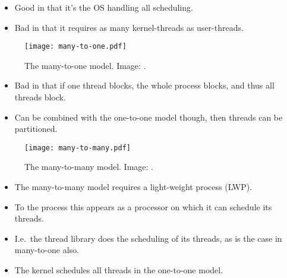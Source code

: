 \documentclass{beamer}
\begin{document}
\begin{frame}{\insertsubsectionhead}
  \begin{itemize}
    \item Good in that it's the OS handling all scheduling.
    \item Bad in that it requires as many kernel-threads as user-threads.
  \end{itemize}
\end{frame}

\begin{frame}{\insertsubsectionhead}
  \begin{figure}
    \texttt{[image: many-to-one.pdf]}
    \caption{The many-to-one model.
      Image: \cite{Silberschatz2013osc}.}
  \end{figure}
\end{frame}

\begin{frame}{\insertsubsectionhead}
  \begin{itemize}
    \item Bad in that if one thread blocks, the whole process blocks, and thus 
      all threads block.

    \item Can be combined with the one-to-one model though, then threads can be 
      partitioned.

  \end{itemize}
\end{frame}

\begin{frame}{\insertsubsectionhead}
  \begin{figure}
    \texttt{[image: many-to-many.pdf]}
    \caption{The many-to-many model.
      Image: \cite{Silberschatz2013osc}.}
  \end{figure}
\end{frame}

\begin{frame}{\insertsubsectionhead}
  \begin{itemize}
    \item The many-to-many model requires a light-weight process (LWP).

    \item To the process this appears as a processor on which it can schedule 
      its threads.

    \item I.e.\ the thread library does the scheduling of its threads, as is 
      the case in many-to-one also.

    \item The kernel schedules all threads in the one-to-one model.
  \end{itemize}
\end{frame}
\end{document}
